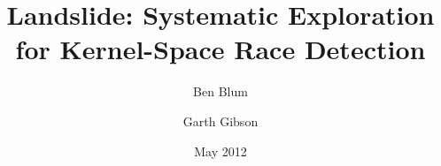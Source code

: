 \documentclass{llncs}
\begin{document}

\title{\bf Landslide: Systematic Exploration for Kernel-Space Race Detection}
\author{Ben Blum \and Garth Gibson}
\date{May 2012}

\maketitle

\newcommand\true{\;\textit{true}}
\newcommand\false{\;\textit{false}}

\newcommand\alpher\alpha
\newcommand\beter\beta
\newcommand\gammer\gamma
\newcommand\delter\delta
\newcommand\zeter\zeta
\newcommand\Sigmer\Sigma

\newcommand\NN{\mathbb{N}}
\newcommand\QQ{\mathbb{Q}}
\newcommand\RR{\mathbb{R}}
\newcommand\ZZ{\mathbb{Z}}

\setcounter{changebargrey}{35}
\newcommand\revision[1]{#1}
\end{document}
